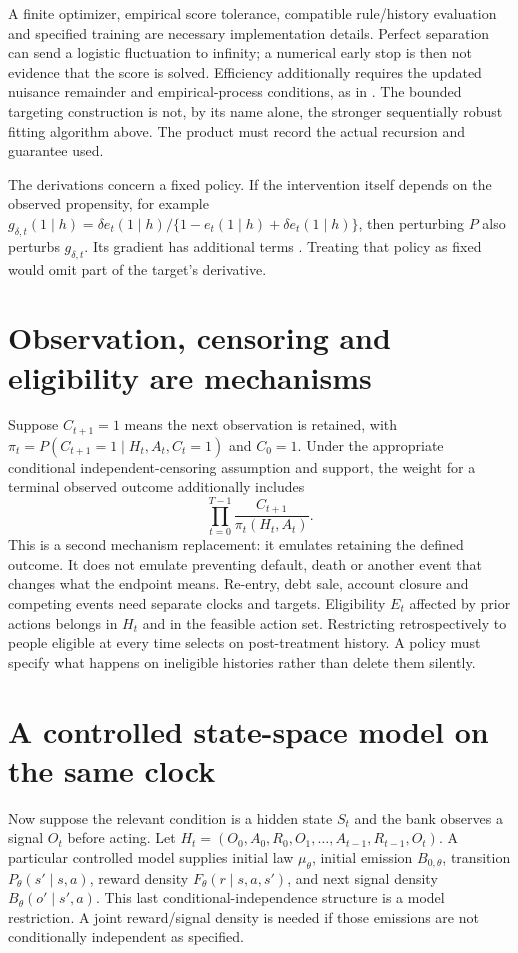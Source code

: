 A finite optimizer, empirical score tolerance, compatible rule/history
evaluation and specified training are necessary implementation details.
Perfect separation can send a logistic fluctuation to infinity; a
numerical early stop is then not evidence that the score is solved.
Efficiency additionally requires the updated nuisance remainder and
empirical-process conditions, as in
\citet[Chapter 4, Section 4.5]{targeted2018}. The bounded targeting
construction is not, by its name alone, the stronger sequentially
robust fitting algorithm above. The product must record the actual
recursion and guarantee used.

The derivations concern a fixed policy. If the intervention itself
depends on the observed propensity, for example
$g_{\delta,t}(1\mid h)=\delta e_t(1\mid h)/\{1-e_t(1\mid h)+\delta e_t(1\mid h)\}$,
then perturbing $P$ also perturbs $g_{\delta,t}$. Its gradient has
additional terms \citep{kennedy2019}. Treating that policy as fixed
would omit part of the target's derivative.

\section{Observation, censoring and eligibility are mechanisms}
Suppose $C_{t+1}=1$ means the next observation is retained, with
$\pi_t=P(C_{t+1}=1\mid H_t,A_t,C_t=1)$ and $C_0=1$. Under the
appropriate conditional independent-censoring assumption and support,
the weight for a terminal observed outcome additionally includes
\[
 \prod_{t=0}^{T-1}\frac{C_{t+1}}{\pi_t(H_t,A_t)}.
\]
This is a second mechanism replacement: it emulates retaining the
defined outcome. It does not emulate preventing default, death or
another event that changes what the endpoint means. Re-entry, debt sale,
account closure and competing events need separate clocks and targets.
Eligibility $E_t$ affected by prior actions belongs in $H_t$ and in
the feasible action set. Restricting retrospectively to people eligible
at every time selects on post-treatment history. A policy must specify
what happens on ineligible histories rather than delete them silently.

\section{A controlled state-space model on the same clock}
\label{r3:state-bridge}
Now suppose the relevant condition is a hidden state $S_t$ and the bank
observes a signal $O_t$ before acting. Let
$H_t=(O_0,A_0,R_0,O_1,\ldots,A_{t-1},R_{t-1},O_t)$.
A particular controlled model supplies initial law $\mu_\theta$,
initial emission $B_{0,\theta}$, transition
$P_\theta(s'\mid s,a)$, reward density
$F_\theta(r\mid s,a,s')$, and next signal density
$B_\theta(o'\mid s',a)$. This last conditional-independence structure
is a model restriction. A joint reward/signal density is needed if
those emissions are not conditionally independent as specified.

